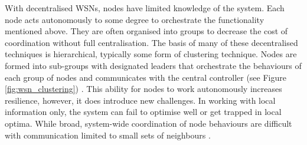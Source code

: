 \ifdefined\DEBUG {} \else \fi
With decentralised WSNs, nodes have limited knowledge of the system. Each node acts autonomously to some degree to orchestrate the functionality mentioned above. They are often organised into groups to decrease the cost of coordination without full centralisation. The basis of many of these decentralised techniques is hierarchical, typically some form of clustering technique. Nodes are formed into sub-groups with designated leaders that orchestrate the behaviours of each group of nodes and communicates with the central controller (see Figure \ref{fig:wsn_clustering}) . This ability for nodes to work autonomously increases resilience, however, it does introduce new challenges. In working with local information only, the system can fail to optimise well or get trapped in local optima. While broad, system-wide coordination of node behaviours are difficult with communication limited to small sets of neighbours \citep{Carlos-Mancilla2016}.

